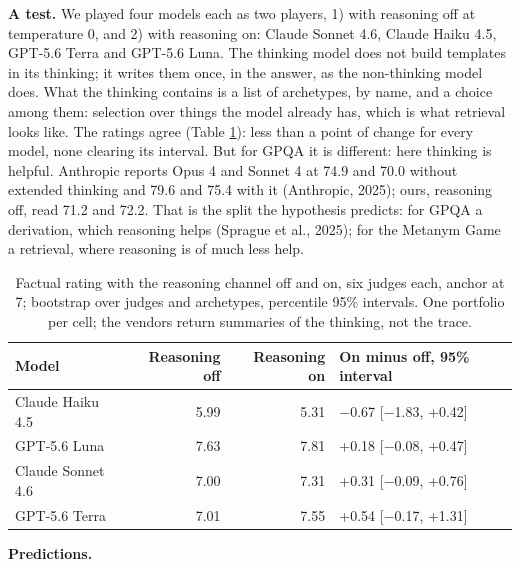 \documentclass{article}
\begin{document}
\textbf{A test.} We played four models each as two players, 1) with reasoning off at temperature 0, and 2) with reasoning on: Claude Sonnet 4.6, Claude Haiku 4.5, GPT-5.6 Terra and GPT-5.6 Luna. The thinking model does not build templates in its thinking; it writes them once, in the answer, as the non-thinking model does. What the thinking contains is a list of archetypes, by name, and a choice among them: selection over things the model already has, which is what retrieval looks like. The ratings agree (Table \ref{tab-thinking}): less than a point of change for every model, none clearing its interval. But for GPQA it is different: here thinking is helpful. Anthropic reports Opus 4 and Sonnet 4 at 74.9 and 70.0 without extended thinking and 79.6 and 75.4 with it (Anthropic, 2025); ours, reasoning off, read 71.2 and 72.2. That is the split the hypothesis predicts: for GPQA a derivation, which reasoning helps (Sprague et al., 2025); for the Metanym Game a retrieval, where reasoning is of much less help.

\begin{table}[htb]
\caption{Factual rating with the reasoning channel off and on, six judges each, anchor at 7; bootstrap over judges and archetypes, percentile 95\% intervals. One portfolio per cell; the vendors return summaries of the thinking, not the trace.}
\label{tab-thinking}
\begin{center}\small
\begin{tabular}{@{}lrrl@{}}
\toprule\noalign{}
Model & Reasoning off & Reasoning on & On minus off, 95\% interval \\
\midrule\noalign{}
Claude Haiku 4.5 & 5.99 & 5.31 & \ensuremath{-}0.67 {[}\ensuremath{-}1.83, +0.42{]} \\
GPT-5.6 Luna & 7.63 & 7.81 & +0.18 {[}\ensuremath{-}0.08, +0.47{]} \\
Claude Sonnet 4.6 & 7.00 & 7.31 & +0.31 {[}\ensuremath{-}0.09, +0.76{]} \\
GPT-5.6 Terra & 7.01 & 7.55 & +0.54 {[}\ensuremath{-}0.17, +1.31{]} \\
\bottomrule
\end{tabular}
\end{center}
\end{table}

\textbf{Predictions.}
\end{document}
